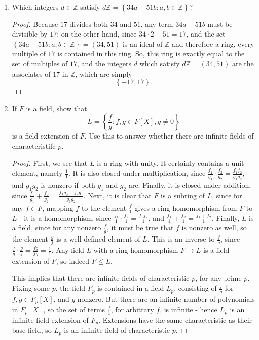 \documentclass[12pt]{article}
\newcommand{\Z}{\mathbb{Z}}
\theoremstyle{definition}
\newenvironment{problem}[2][Problem]{\begin{trivlist}
\item[\hskip \labelsep {\bfseries #1}\hskip \labelsep {\bfseries #2.}]}{\end{trivlist}}
\begin{document}
\begin{problem}{4}
	\begin{enumerate}[label=(\alph*)]
		\item Which integers $d \in \Z$ satisfy $d\Z = \left\{ 34a - 51b: a, b \in \Z \right\}$?
			\begin{proof}
				Because $17$ divides both $34$ and $51$, any term $34a - 51b$ must be divisible by $17$; on the other hand, since $34 \cdot 2 - 51 = 17$, and the set $\left\{ 34a - 51b : a, b \in \Z \right\} = (34, 51)$ is an ideal of $\Z$ and therefore a ring, every multiple of $17$ is contained in this ring. So, this ring is exactly equal to the set of multiples of $17$, and the integers $d$ which satisfy $d\Z = (34, 51)$ are the associates of $17$ in $\Z$, which are simply
				\[\left\{ -17, 17 \right\}.\]
			\end{proof}
		\item If $F$ is a field, show that 
			\[L = \left\{ \frac{f}{g}: f, g \in F[X], g \neq 0 \right\}\]
			is a field extension of $F$. Use this to answer whether there are infinite fields of characteristifc $p$.
			\begin{proof}
				First, we see that $L$ is a ring with unity. It certainly contains a unit element, namely $\frac{1}{1}$. It is also closed under multiplication, since $\frac{f_1}{g_1} \cdot \frac{f_2}{g_2} = \frac{f_1f_2}{g_1g_2}$, and $g_1g_2$ is nonzero if both $g_1$ and $g_2$ are. Finally, it is closed under addition, since $\frac{f_1}{g_1} + \frac{f_2}{g_2} = \frac{f_1g_2 + f_2g_1}{g_1g_2}$.
			Next, it is clear that $F$ is a subring of $L$, since for any $f \in F$, mapping $f$ to the element $\frac{f}{1}$ gives a ring homomorphism from $F$ to $L$ - it is a homomorphism, since $\frac{f_1}{1} \cdot \frac{f_2}{1} = \frac{f_1f_2}{1}$, and $\frac{f_1}{1} + \frac{f_2}{1} = \frac{f_1 + f_2}{1}$.
			Finally, $L$ is a field, since for any nonzero $\frac{f}{g}$, it must be true that $f$ is nonzero as well, so the element $\frac{g}{f}$ is a well-defined element of $L$. This is an inverse to $\frac{f}{g}$, since $\frac{f}{g}\cdot \frac{g}{f} = \frac{fg}{fg} = \frac{1}{1}$. Any field $L$ with a ring homomorphism $F \to L$ is a field extension of $F$, so indeed $F \leq L$.
			\par This implies that there are infinite fields of characteristic $p$, for any prime $p$. Fixing some $p$, the field $F_p$ is contained in a field $L_p$, consisting of $\frac{f}{g}$ for $f, g \in F_p[X]$, and $g$ nonzero. But there are an infinite number of polynomials in $F_p[X]$, so the set of terms $\frac{f}{1}$, for arbitrary $f$, is infinite - hence $L_p$ is an infinite field extension of $F_p$. Extensions have the same characteristic as their base field, so $L_p$ is an infinite field of characteristic $p$.

\end{proof}
\end{enumerate}
\end{problem}
\end{document}
